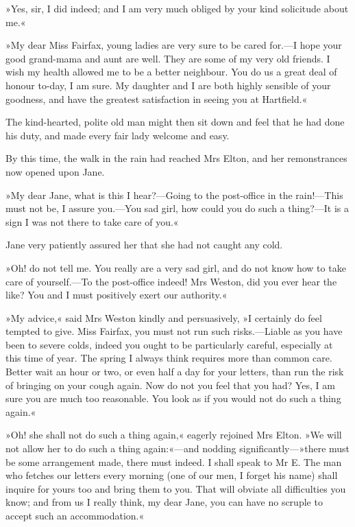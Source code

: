»Yes, sir, I did indeed; and I am very much obliged by your kind solicitude about me.«

»My dear Miss Fairfax, young ladies are very sure to be cared for.—I hope your good grand-mama and aunt are well. They are some of my very old friends. I wish my health allowed me to be a better neighbour. You do us a great deal of honour to-day, I am sure. My daughter and I are both highly sensible of your goodness, and have the greatest satisfaction in seeing you at Hartfield.«

The kind-hearted, polite old man might then sit down and feel that he had done his duty, and made every fair lady welcome and easy.

By this time, the walk in the rain had reached Mrs Elton, and her remonstrances now opened upon Jane.

»My dear Jane, what is this I hear?—Going to the post-office in the rain!—This must not be, I assure you.—You sad girl, how could you do such a thing?—It is a sign I was not there to take care of you.«

Jane very patiently assured her that she had not caught any cold.

»Oh! do not tell me. You really are a very sad girl, and do not know how to take care of yourself.—To the post-office indeed! Mrs Weston, did you ever hear the like? You and I must positively exert our authority.«

»My advice,« said Mrs Weston kindly and persuasively, »I certainly do feel tempted to give. Miss Fairfax, you must not run such risks.—Liable as you have been to severe colds, indeed you ought to be particularly careful, especially at this time of year. The spring I always think requires more than common care. Better wait an hour or two, or even half a day for your letters, than run the risk of bringing on your cough again. Now do not you feel that you had? Yes, I am sure you are much too reasonable. You look as if you would not do such a thing again.«

»Oh! she shall not do such a thing again,« eagerly rejoined Mrs Elton. »We will not allow her to do such a thing again:«—and nodding significantly—»there must be some arrangement made, there must indeed. I shall speak to Mr E. The man who fetches our letters every morning (one of our men, I forget his name) shall inquire for yours too and bring them to you. That will obviate all difficulties you know; and from us I really think, my dear Jane, you can have no scruple to accept such an accommodation.«

